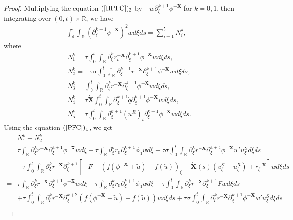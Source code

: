\documentclass[10pt,reqno]{amsart}
\numberwithin{equation}{section}
\begin{document}
	\begin{proof}
		Multiplying the equation $(\ref{HPFC})_2$ by $-w\partial_{\xi}^{k+1}\phi^{-\mathbf{X}}$ for $k=0,1$, then integrating over $(0,t)\times\mathbb{R}$, we have
		\begin{align*}
			\int_{0}^t\int_{\mathbb{R}}(\partial_{\xi}^{k+1}\phi^{-\mathbf{X}})^2wd\xi ds=\sum_{i=1}^{5}N_i^k,
		\end{align*}
		where
		\begin{align*}
			&N_1^k=\tau\int_{0}^t\int_{\mathbb{R}}\partial_{\xi}^kr^{-\mathbf{X}}_t\partial_{\xi}^{k+1}\phi^{-\mathbf{X}}wd\xi ds,\\
			&N_2^k=-\tau\sigma\int_{0}^t\int_{\mathbb{R}}\partial_{\xi}^{k+1}r^{-\mathbf{X}}\partial_{\xi}^{k+1}\phi^{-\mathbf{X}}wd\xi ds,\\
			&N_3^k=\int_{0}^t\int_{\mathbb{R}}\partial_{\xi}^kr^{-\mathbf{X}}\partial_{\xi}^{k+1}\phi^{-\mathbf{X}}wd\xi ds,\\
			&N_4^k=\tau\dot{\mathbf{X}}\int_{0}^t\int_{\mathbb{R}}\partial_{\xi}^{k+1}\tilde{q}\partial_{\xi}^{k+1}\phi^{-\mathbf{X}}wd\xi ds,\\
			&N_5^k=\tau\int_{0}^t\int_{\mathbb{R}}\partial_{\xi}^{k+1}(u^R)_t\partial_{\xi}^{k+1}\phi^{-\mathbf{X}}wd\xi ds.
		\end{align*}
		Using the equation $(\ref{PFC})_1$, we get 
		\begin{align*}
			&N_1^k+N_2^k\\
			=&\tau\int_{\mathbb{R}}\partial_{\xi}^kr^{-\mathbf{X}}\partial_{\xi}^{k+1}\phi^{-\mathbf{X}}wd\xi-\tau\int_{\mathbb{R}}\partial_{\xi}^kr_0\partial_{\xi}^{k+1}\phi_{0}wd\xi+\tau\sigma\int_{0}^t\int_{\mathbb{R}}\partial_{\xi}^kr^{-\mathbf{X}}\partial_{\xi}^{k+1}\phi^{-\mathbf{X}}w'u^S_{\xi}d\xi ds\\
			&-\tau\int_{0}^t\int_{\mathbb{R}}\partial_{\xi}^kr^{-\mathbf{X}}\partial_{\xi}^{k+1}\left[-F-\left(f(\phi^{-\mathbf{X}}+\tilde{u})-f(\tilde{u})\right)_{\xi}-\dot{\mathbf{X}}(s)\left(u^S_{\xi}+u^R_{\xi}\right)+r^{-\mathbf{X}}_{\xi}\right]wd\xi ds\\
			=&\tau\int_{\mathbb{R}}\partial_{\xi}^kr^{-\mathbf{X}}\partial_{\xi}^{k+1}\phi^{-\mathbf{X}}wd\xi-\tau\int_{\mathbb{R}}\partial_{\xi}^kr_0\partial_{\xi}^{k+1}\phi_{0}wd\xi+\tau\int_0^t\int_{\mathbb{R}}\partial_{\xi}^kr^{-\mathbf{X}}\partial_{\xi}^{k+1}Fwd\xi ds\\
			&+\tau\int_0^t\int_{\mathbb{R}}\partial_{\xi}^kr^{-\mathbf{X}}\partial_{\xi}^{k+2}\left(f(\phi^{-\mathbf{X}}+\tilde{u})-f(\tilde{u})\right)wd\xi ds+\tau\sigma\int_{0}^t\int_{\mathbb{R}}\partial_{\xi}^kr^{-\mathbf{X}}\partial_{\xi}^{k+1}\phi^{-\mathbf{X}}w'u^S_{\xi}d\xi ds\\

\end{align*}
\end{proof}
\end{document}
